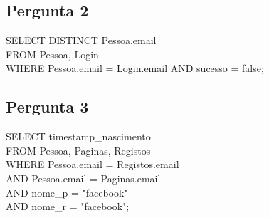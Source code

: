 \documentclass[11pt,a4paper]{article}
\begin{document}
\subsection{Pergunta 2}
SELECT DISTINCT Pessoa.email 
\\FROM Pessoa, Login 
\\WHERE Pessoa.email = Login.email AND sucesso = false;

\subsection{Pergunta 3}
SELECT timestamp\_nascimento
\\FROM Pessoa, Paginas, Registos 
\\WHERE Pessoa.email = Registos.email 
\\AND Pessoa.email = Paginas.email 
\\AND nome\_p = "facebook" 
\\AND nome\_r = "facebook";
\end{document}

